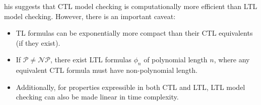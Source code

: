 his suggests that CTL model checking is computationally more efficient than LTL model checking.
However, there is an important caveat:
\begin{itemize}
    \item TL formulas can be exponentially more compact than their CTL equivalents (if they exist).
    \item If $\mathcal{P}\neq\mathcal{NP}$, there exist LTL formulas $\phi_n$ of polynomial length $n$, where any equivalent CTL formula must have non-polynomial length.
    \item Additionally, for properties expressible in both CTL and LTL, LTL model checking can also be made linear in time complexity.
\end{itemize}